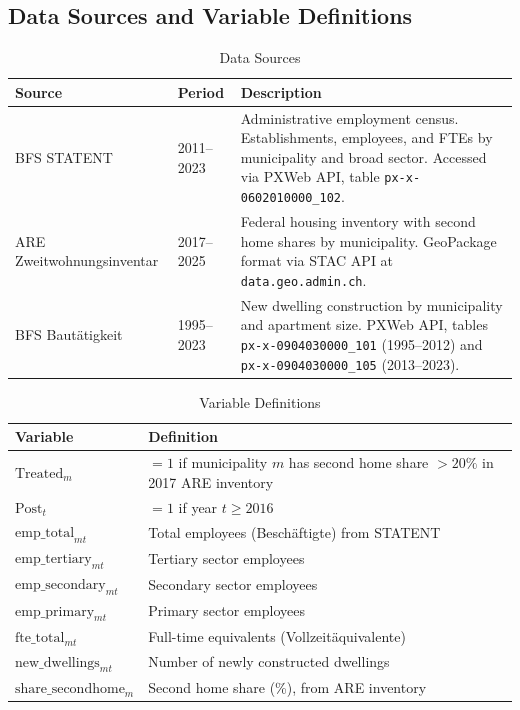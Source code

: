 \documentclass[12pt]{article}
\begin{document}
\newpage
\begin{appendices}

\section{Data Sources and Variable Definitions}\label{app:data}

\begin{table}[htbp]
\centering
\caption{Data Sources}
\begin{tabular}{llp{6cm}}
\toprule
Source & Period & Description \\
\midrule
BFS STATENT & 2011--2023 & Administrative employment census. Establishments, employees, and FTEs by municipality and broad sector. Accessed via PXWeb API, table \texttt{px-x-0602010000\_102}. \\
\addlinespace
ARE Zweitwohnungsinventar & 2017--2025 & Federal housing inventory with second home shares by municipality. GeoPackage format via STAC API at \texttt{data.geo.admin.ch}. \\
\addlinespace
BFS Bautätigkeit & 1995--2023 & New dwelling construction by municipality and apartment size. PXWeb API, tables \texttt{px-x-0904030000\_101} (1995--2012) and \texttt{px-x-0904030000\_105} (2013--2023). \\
\bottomrule
\end{tabular}
\end{table}

\begin{table}[htbp]
\centering
\caption{Variable Definitions}
\begin{tabular}{lp{8cm}}
\toprule
Variable & Definition \\
\midrule
$\text{Treated}_m$ & $= 1$ if municipality $m$ has second home share $> 20\%$ in 2017 ARE inventory \\
$\text{Post}_t$ & $= 1$ if year $t \geq 2016$ \\
$\text{emp\_total}_{mt}$ & Total employees (Beschäftigte) from STATENT \\
$\text{emp\_tertiary}_{mt}$ & Tertiary sector employees \\
$\text{emp\_secondary}_{mt}$ & Secondary sector employees \\
$\text{emp\_primary}_{mt}$ & Primary sector employees \\
$\text{fte\_total}_{mt}$ & Full-time equivalents (Vollzeitäquivalente) \\
$\text{new\_dwellings}_{mt}$ & Number of newly constructed dwellings \\
$\text{share\_secondhome}_m$ & Second home share (\%), from ARE inventory \\
\bottomrule
\end{tabular}
\end{table}


\end{appendices}
\end{document}
